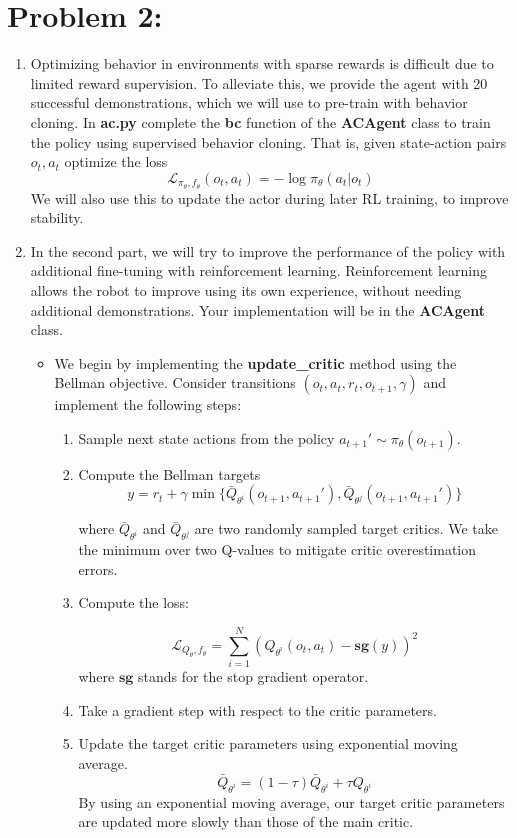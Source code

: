 \documentclass[12pt]{article}
\begin{document}
\section*{Problem 2: }
\begin{enumerate}
\item Optimizing behavior in environments with sparse rewards is difficult due to limited reward supervision. To alleviate this, we provide the agent with 20 successful demonstrations, which we will use to pre-train with behavior cloning. In \textbf{ac.py} complete the \textbf{bc} function of the \textbf{ACAgent} class to train the policy using supervised behavior cloning. That is, given state-action pairs $o_t, a_t$ optimize the loss
$$\mathcal{L}_{\pi_{\theta}, f_{\theta}}(o_t, a_t) = -\log \pi_{\theta}(a_t|o_t)$$
We will also use this to update the actor during later RL training, to improve stability.

\item In the second part, we will try to improve the performance of the policy with additional fine-tuning with reinforcement learning. Reinforcement learning allows the robot to improve using its own experience, without needing additional demonstrations. Your implementation will be in the \textbf{ACAgent} class.

\begin{itemize}

    \item We begin by implementing the \textbf{update\_critic} method using the Bellman objective. Consider transitions $(o_t, a_t, r_t, o_{t+1}, \gamma)$ and implement the following steps:
    \begin{enumerate}
        \item Sample next state actions from the policy $a_{t+1}'\sim \pi_{\theta}(o_{t+1})$.
        \item Compute the Bellman targets $$y = r_t + \gamma\min\{\bar{Q}_{\theta^i}(o_{t+1}, a_{t+1}'), \bar{Q}_{\theta^j}(o_{t+1}, a_{t+1}')\}$$

        where $\bar{Q}_{\theta^i}$ and $\bar{Q}_{\theta^j}$ are two randomly sampled target critics. We take the minimum over two Q-values to mitigate critic overestimation errors.
        \item Compute the loss:
            
            $$\mathcal{L}_{Q_{\theta}, f_{\theta}} = \sum_{i=1}^N (Q_{\theta^i}(o_{t}, a_t)-\mathbf{sg}(y))^2$$
        where $\mathbf{sg}$ stands for the stop gradient operator.
        \item Take a gradient step with respect to the critic parameters.
        \item Update the target critic parameters using exponential moving average.
        $$\bar{Q}_{\theta^i} = (1-\tau)\bar{Q}_{\theta^i} + \tau Q_{\theta^i}$$
        By using an exponential moving average, our target critic parameters are updated more slowly than those of the main critic.
    

\end{enumerate}
\end{itemize}
\end{enumerate}
\end{document}
